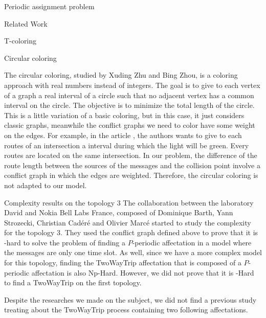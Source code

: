 \documentclass[a4paper,10pt]{report}
\begin{document}
\begin{chapter}{Periodic assignment problem}
\begin{section}{Related Work}
\begin{subsection}{T-coloring}
\end{subsection}
\begin{subsection}{Circular coloring}

 The circular coloring, studied by Xuding Zhu\cite{zhu2006recent}\cite{zhu2001circular} and Bing Zhou\cite{zhou2013multiple},
 is a coloring approach with real numbers instead of integers. The goal is to give to each vertex of a graph 
 a real interval of a circle such that no adjacent vertex has a common interval on the circle. The objective is to minimize the total length of the circle. This is a little variation of a
 basic coloring, but in this case, it just considers classic graphs, meanwhile the conflict graphs we need to color have some weight
 on the edges.
 For example, in the article \cite{zhu2001circular}, the authors wants to give to each routes of an intersection a interval during which the light will be green. Every routes are located on the same intersection. In our problem, the difference of the route length between the sources of the messages and the collision point involve a conflict graph in which the edges are weighted.
 Therefore, the circular coloring is not adapted to our model.

\end{subsection}

\begin{subsection}{Complexity results on the topology 3}
 The collaboration between the laboratory David and Nokia Bell Labs France, composed of Dominique Barth, Yann Strozecki, Christian Cadéré and Olivier Marcé started to study the complexity for the topology 3.
 They used the conflict graph defined above to prove that it is \NP-hard to solve the problem of finding a $P$-periodic affectation in a model where the
 messages are only one time slot. As well, since we have a more complex model for this topology, finding the TwoWayTrip affectation
 that is composed of a $P$-periodic affectation is also Np-Hard. However, we did not prove that it is \NP-Hard to find
 a TwoWayTrip on the first topology.
\end{subsection}

 \end{section}

Despite the researches we made on the subject, we did not find a previous study treating about the TwoWayTrip process containing two 
following affectations.
\end{chapter}
\end{document}
